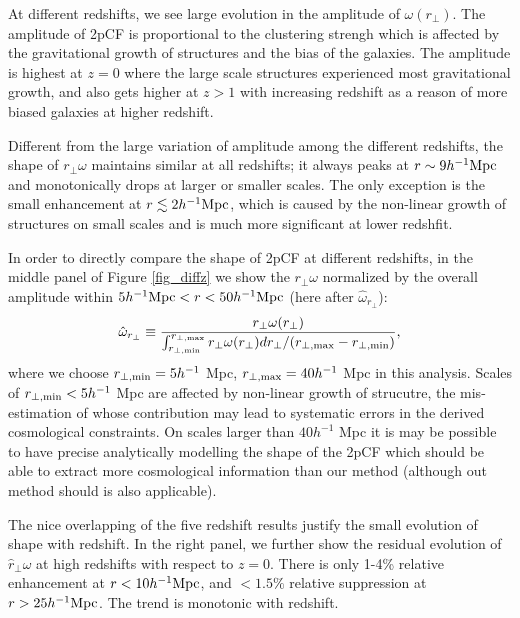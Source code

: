 \documentclass[iop]{emulateapj}
\begin{document}
At different redshifts, we see large evolution in the amplitude of $\omega(r_\perp)$.
The amplitude of 2pCF is proportional to the clustering strengh which is affected by the gravitational growth of structures and the bias of the galaxies.
The amplitude is highest at $z=0$ where the large scale structures experienced most gravitational growth,
and also gets higher at $z>1$ with increasing redshift as a reason of more biased galaxies at higher redshift.

Different from the large variation of amplitude among the different redshifts, %
the shape of $r_\perp\omega$ maintains similar at all redshifts;
it always peaks at $r\sim9 h^{-1}\rm Mpc$ and monotonically drops at larger or smaller scales.
The only exception is the small enhancement at $r\lesssim 2 h^{-1}\rm Mpc$,
which is caused by the non-linear growth of structures on small scales 
and is much more significant at lower redshfit.

In order to directly compare the shape of 2pCF at different redshifts,
in the middle panel of Figure \ref{fig_diffz} we show the $r_\perp\omega$ normalized by the overall amplitude within $5h^{-1}{\rm Mpc} < r < 50h^{-1}{\rm Mpc}$
(here after $\hat \omega_{r_\perp}$):
\begin{equation}
 \hat \omega_{ r_\perp} \equiv  \frac{ {r_\perp\omega}(r_{\perp})}{ \int_{r_{\perp, \rm min}}^{r_{\perp, \rm max}}r_{\perp} \omega(r_{\perp}) d r_{\perp} / (r_{\perp,\rm max}-r_{\perp,\rm min}) },
\end{equation}
where we choose $r_{\perp, \rm min}=5 h^{-1}$ Mpc, $r_{\perp, \rm max}=40 h^{-1}$ Mpc in this analysis.
Scales of $r_{\perp, \rm min}<5 h^{-1}$ Mpc are affected by non-linear growth of strucutre, 
the mis-estimation of whose contribution may lead to systematic errors in the derived cosmological constraints.
On scales larger than $40 h^{-1}$ Mpc it is may be possible to have precise analytically modelling the shape of the 2pCF
 \citep{Salvador2014,Salvador2016} which should be able to extract more cosmological information than our method 
(although out method should is also applicable).


The nice overlapping of the five redshift results
justify the small evolution of shape with redshift.
In the right panel, we further show the residual evolution of $\hat r_\perp\omega$ at high redshifts 
with respect to $z=0$.
There is only 1-4\% relative enhancement 
at $r<10h^{-1}\rm Mpc$,
and $<1.5\%$ relative suppression at $r>25 h^{-1}\rm Mpc$.
The trend is monotonic with redshift.
\end{document}
